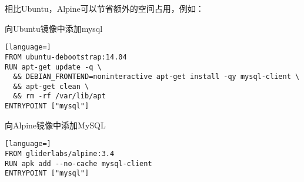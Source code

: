 相比Ubuntu，Alpine可以节省额外的空间占用，例如：

\begin{example}
向Ubuntu镜像中添加mysql
\begin{lstlisting}[language=]
FROM ubuntu-debootstrap:14.04
RUN apt-get update -q \
  && DEBIAN_FRONTEND=noninteractive apt-get install -qy mysql-client \
  && apt-get clean \
  && rm -rf /var/lib/apt
ENTRYPOINT ["mysql"]
\end{lstlisting}
\end{example}

\begin{example}
向Alpine镜像中添加MySQL
\begin{lstlisting}[language=]
FROM gliderlabs/alpine:3.4
RUN apk add --no-cache mysql-client
ENTRYPOINT ["mysql"]
\end{lstlisting}
\end{example}


